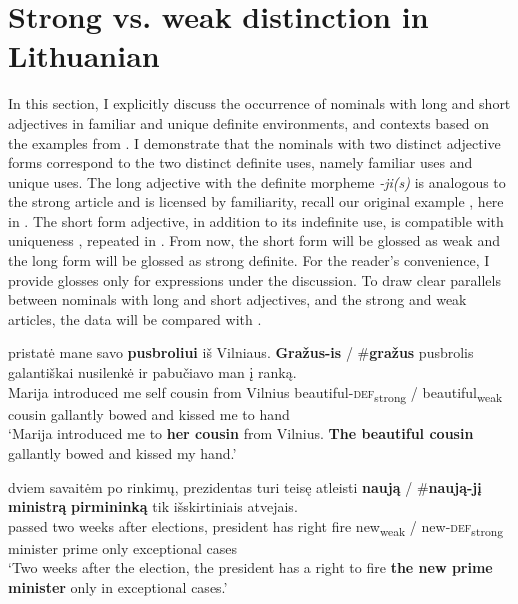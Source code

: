 \documentclass[output=paper,
modfonts
]{langscibook}
\begin{document}
\section{Strong vs. weak distinction in Lithuanian} \label{sec:sereikaite:4}

In this section, I explicitly discuss the occurrence of  nominals with long and short adjectives in familiar and unique definite environments, and  contexts based on the examples from \citet{Schwarz2009}. I demonstrate that the nominals with two distinct adjective forms correspond to the two distinct definite uses, namely familiar uses and unique uses. The long adjective with the definite morpheme \textit{-ji(s)} is analogous to the  strong article and is licensed by familiarity, recall our original example , here in . The short form adjective, in addition to its indefinite use, is compatible with uniqueness , repeated in . From now, the short form will be glossed as weak and the long form will be glossed as strong definite. For the reader's convenience, I provide glosses only for expressions under the discussion. To draw clear parallels between nominals with long and short adjectives, and the strong and weak articles, the  data will be compared with . 

\begin{exe}
	\ex \label{ex:sereikaite:27}
	 {pristatė} {mane} {savo} {\textbf{pusbroliui}} {iš} {Vilniaus}. \textbf{Gražus-is} \textnormal{/} \textnormal{\#}\textbf{gražus} {pusbrolis} {galantiškai} {nusilenkė} {ir} {pabučiavo} {man} {į} {ranką}.\\
	Marija introduced me self {cousin} from Vilnius {beautiful-\textsc{def}\textsubscript{strong}} / {\phantom{\#}beautiful\textsubscript{weak}} cousin gallantly bowed and kissed me to hand \\
	\trans `Marija introduced me to \textbf{her cousin} from Vilnius. \textbf{The beautiful cousin} gallantly bowed and kissed my hand.'
\end{exe}

\begin{exe}
	\ex \label{ex:sereikaite:28}
	 {dviem} {savaitėm} {po} {rinkimų}, {prezidentas} {turi} {teisę} {atleisti} \textbf{naują} \textnormal{/} \textnormal{\#}\textbf{naują-jį} \textbf{{ministrą}} \textbf{{pirmininką}} {tik} {išskirtiniais} {atvejais}.\\
	passed two weeks after elections, president has right fire {new\textsubscript{weak}} / {\phantom{\#}new-\textsc{def}\textsubscript{strong}} {minister} {prime} only exceptional cases\\
	\trans `Two weeks after the election, the president has a right to fire \textbf{the new prime minister} only in exceptional cases.' 
\end{exe}
\end{document}
